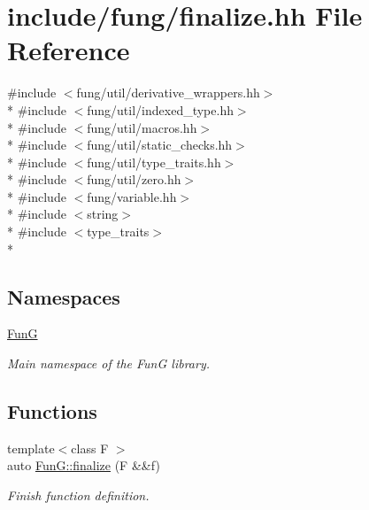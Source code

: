 \hypertarget{finalize_8hh}{\section{include/fung/finalize.hh File Reference}
\label{finalize_8hh}
}
{\ttfamily \#include $<$fung/util/derivative\-\_\-wrappers.\-hh$>$}\\*
{\ttfamily \#include $<$fung/util/indexed\-\_\-type.\-hh$>$}\\*
{\ttfamily \#include $<$fung/util/macros.\-hh$>$}\\*
{\ttfamily \#include $<$fung/util/static\-\_\-checks.\-hh$>$}\\*
{\ttfamily \#include $<$fung/util/type\-\_\-traits.\-hh$>$}\\*
{\ttfamily \#include $<$fung/util/zero.\-hh$>$}\\*
{\ttfamily \#include $<$fung/variable.\-hh$>$}\\*
{\ttfamily \#include $<$string$>$}\\*
{\ttfamily \#include $<$type\-\_\-traits$>$}\\*
\subsection*{Namespaces}
\begin{DoxyCompactItemize}
\item 
\hyperlink{namespaceFunG}{Fun\-G}
\begin{DoxyCompactList}\small\item\em Main namespace of the Fun\-G library. \end{DoxyCompactList}\end{DoxyCompactItemize}
\subsection*{Functions}
\begin{DoxyCompactItemize}
\item 
{\footnotesize template$<$class F $>$ }\\auto \hyperlink{namespaceFunG_ac59f2ececc3cd451860776320a4a93d5}{Fun\-G\-::finalize} (F \&\&f)
\begin{DoxyCompactList}\small\item\em Finish function definition. \end{DoxyCompactList}\end{DoxyCompactItemize}
